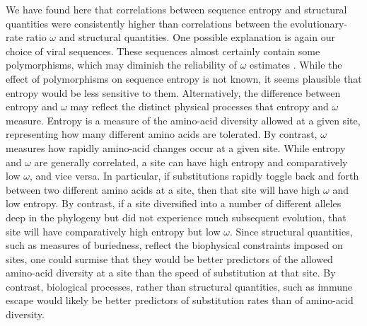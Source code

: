 \documentclass[smallextended]{svjour3}
\begin{document}
We have found here that correlations between sequence entropy and structural quantities were consistently higher than correlations between the evolutionary-rate ratio $\omega$ and structural quantities. One possible explanation is again our choice of viral sequences. These sequences almost certainly contain some polymorphisms, which may diminish the reliability of $\omega$ estimates \citep{KryazhimskiyPlotkin2008}. While the effect of polymorphisms on sequence entropy is not known, it seems plausible that entropy would be less sensitive to them. Alternatively, the difference between entropy and $\omega$ may reflect the distinct physical processes that entropy and $\omega$ measure. Entropy is a measure of the amino-acid diversity allowed at a given site, representing how many different amino acids are tolerated. By contrast, $\omega$ measures how rapidly amino-acid changes occur at a given site. While entropy and $\omega$ are generally correlated, a site can have high entropy and comparatively low $\omega$, and vice versa. In particular, if substitutions rapidly toggle back and forth between two different amino acids at a site, then that site will have high $\omega$ and low entropy. By contrast, if a site diversified into a number of different alleles deep in the phylogeny but did not experience much subsequent evolution, that site will have comparatively high entropy but low $\omega$. Since structural quantities, such as measures of buriedness, reflect the biophysical constraints imposed on sites, one could surmise that they would be better predictors of the allowed amino-acid diversity at a site than the speed of substitution at that site. By contrast, biological processes, rather than structural quantities, such as immune escape would likely be better predictors of substitution rates than of amino-acid diversity. 
\end{document}
